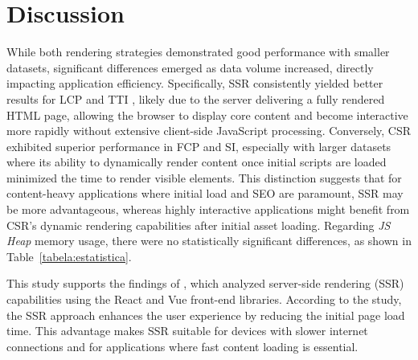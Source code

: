 \section{Discussion}
\label{sec:discussion}


While both rendering strategies demonstrated good performance with smaller datasets, significant differences emerged as data volume increased, directly impacting application efficiency. Specifically, SSR consistently yielded better results for LCP and TTI , likely due to the server delivering a fully rendered HTML page, allowing the browser to display core content and become interactive more rapidly without extensive client-side JavaScript processing. Conversely, CSR exhibited superior performance in FCP and SI, especially with larger datasets where its ability to dynamically render content once initial scripts are loaded minimized the time to render visible elements. This distinction suggests that for content-heavy applications where initial load and SEO are paramount, SSR may be more advantageous, whereas highly interactive applications might benefit from CSR's dynamic rendering capabilities after initial asset loading. Regarding \textit{JS Heap} memory usage, there were no statistically significant differences, as shown in Table~\ref{tabela:estatistica}.

This study supports the findings of \citet{meredova2023ssr}, which analyzed server-side rendering (SSR) capabilities using the React and Vue front-end libraries. According to the study, the SSR approach enhances the user experience by reducing the initial page load time. This advantage makes SSR suitable for devices with slower internet connections and for applications where fast content loading is essential.

